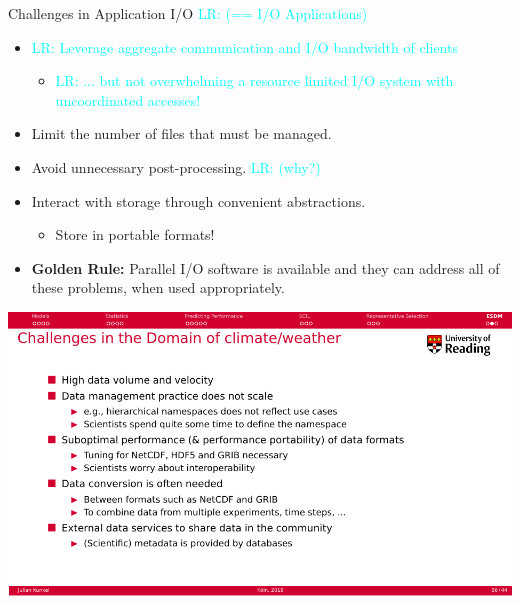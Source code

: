 \documentclass[compress,11pt,xcolor=svgnames,aspectratio=169]{beamer}
\newcommand{\lr}[1]{\textcolor{cyan}{LR: #1}}
\begin{document}
\begin{frame}[fragile]{Challenges in Application I/O \lr{(== I/O Applications)}}

\begin{itemize}
\setlength\itemsep{0.4cm}

\item \lr{Leverage aggregate communication and I/O bandwidth of clients}
    \begin{itemize}
        \item \lr{... but not overwhelming a resource limited I/O system with uncoordinated accesses!}
    \end{itemize}

\item Limit the number of files that must be managed.

\item Avoid unnecessary post-processing. \lr{(why?)}

\item Interact with storage through convenient abstractions.
    \begin{itemize}
      \item Store in portable formats!
    \end{itemize}

\item {\color{gold}\textbf{Golden Rule:}} Parallel I/O software is available and they can address all
of these problems, when used appropriately.

\end{itemize}

\nocite{pio-sc17}

\end{frame}

\begin{frame}[fragile]{}

\begin{center}
\includegraphics[scale=0.6]{fig/esdm-chall}
\end{center}

\end{frame}
\end{document}
